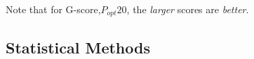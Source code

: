 \documentclass[10pt,journal,compsoc]{IEEEtran}
\begin{document}
Note that for  G-score,$P_{opt}20$, the {\em larger} scores are {\em better}.
  
  


\subsection{Statistical Methods}\label{tion:stats}
\end{document}
